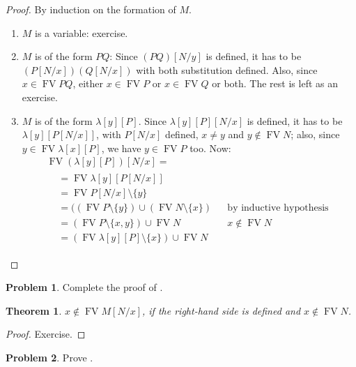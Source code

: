 \documentclass[10pt,a4paper]{article}
\makeatletter
\theoremstyle{plain}
\newtheorem{thm}{Theorem}[section]
\theoremstyle{definition}
\newtheorem{prob}{Problem}[section]
\theoremstyle{remark}
\newcommand*{\ollabel}[1]{\label{#1}}
\newcommand{\olref}{\@ifnextchar[{\olref@i}{\olref@final}}
\def\olref@i[#1]{\@ifnextchar[{\olref@ii}{\olref@final}}
\def\olref@ii[#1]{\@ifnextchar[{\olref@iii}{\olref@final}}
\def\olref@iii[#1]{\olref@final}
\def\olref@final#1{\ref{#1}}
\providecommand{\Subst}[3]{#1[#2/#3]}
\providecommand{\lambd}{\ensuremath{\lambda}}
\providecommand{\FV}{\operatorname{FV}}
\providecommand{\FV}{\operatorname{FV}}
\makeatother
\begin{document}
\begin{proof}
  By induction on the formation of $M$.
  \begin{enumerate}
  \item $M$ is a variable: exercise.
  \item $M$ is of the form $PQ$: Since
    $\Subst{(PQ)}{N}{y}$ is defined, it has to be
    $(\Subst{P}{N}{x})(\Subst{Q}{N}{x})$ with both substitution
    defined. Also, since $x \in \FV{PQ}$, either $x \in \FV{P}$ or
    $x \in \FV{Q}$ or both. The rest is left as an exercise.
  \item $M$ is of the form $\lambd[y][P]$. Since
    $\Subst{\lambd[y][P]}{N}{x}$ is defined, it has to be
    $\lambd[y][\Subst{P}{N}{x}]$, with $\Subst{P}{N}{x}$
    defined, $x \neq y$ and $y \notin \FV{N}$; also, since $y \in
    \FV{\lambd[x][P]}$, we have $y \in \FV{P}$ too. Now:
    \begin{multline*}
      \FV{\Subst{(\lambd[y][P])}{N}{x}} = \\
      \begin{aligned}
      & = \FV{\lambd[y][\Subst{P}{N}{x}]} \\
      & = \FV{\Subst{P}{N}{x}} \setminus \{y\} \\
      & = ((\FV{P} \setminus \{y\}) \cup (\FV{N} \setminus \{x\})
       && \text{by inductive hypothesis} \\
      & = (\FV{P} \setminus \{x, y\}) \cup \FV{N}
       && x \notin \FV{N} \\
      & = (\FV{\lambd[y][P]} \setminus \{x\}) \cup \FV{N}
      \end{aligned}
      \end{multline*}
  \end{enumerate}
\end{proof}

\begin{prob}
  Complete the proof of \olref[lam][syn][sub]{thm:infv}.
\end{prob}

\begin{thm}\ollabel{thm:clr}
  $x \notin \FV{\Subst{M}{N}{x}}$, if the right-hand side is
  defined and $x \notin \FV{N}$.
\end{thm}

\begin{proof}
  Exercise.
\end{proof}

\begin{prob}
  Prove \olref[lam][syn][sub]{thm:clr}.
\end{prob}
\end{document}
